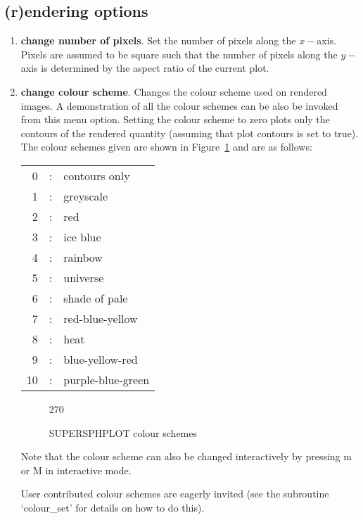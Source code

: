 \documentclass[a4paper,11pt]{article}
\begin{document}
\subsection{(r)endering options}
\begin{enumerate}
\item \textbf{change number of pixels}. Set the number of pixels along the
$x-$axis. Pixels are assumed to be square such that the number of pixels along
the $y-$axis is determined by the aspect ratio of the current plot.
\item \textbf{change colour scheme}. Changes the colour scheme used on rendered
images. A demonstration of all the colour schemes can be also be invoked from
this menu option. Setting the colour scheme to zero plots only the contours of
the rendered quantity (assuming that plot contours is set to true). The colour
schemes given are shown in Figure~\ref{fig:colourschemes} and are as follows:

\begin{tabular}{rcp{}}
  0 & : & contours only \\
  1 & : & greyscale \\
  2 & : & red \\
  3 & : & ice blue \\
  4 & : & rainbow \\
  5 & : & universe \\
  6 & : & shade of pale \\
  7 & : & red-blue-yellow \\
  8 & : & heat \\
  9 & : & blue-yellow-red \\
  10 & : & purple-blue-green \\
\end{tabular}

\begin{figure}
\begin{center}
\begin{turn}{270}\end{turn}
\caption{SUPERSPHPLOT colour schemes}
\label{fig:colourschemes}
\end{center}
\end{figure}
Note that the colour scheme can also be changed interactively by pressing m or M
in interactive mode.

 User contributed colour schemes are eagerly invited (see the subroutine
`colour\_set' for details on how to do this).


\end{enumerate}
\end{document}
